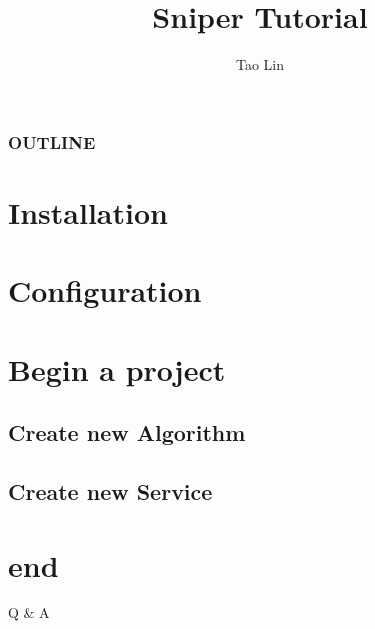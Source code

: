 \documentclass{beamer}
\begin{document}
\title{Sniper Tutorial}
\author{
    \texorpdfstring{Tao Lin}
                    {Lin Tao}
}


\maketitle

\begin{frame}
    \frametitle{OUTLINE}
    \tableofcontents
\end{frame}

\section{Installation}
    
\section{Configuration}
    
\section{Begin a project}
    
\subsection{Create new Algorithm}
    
\subsection{Create new Service}
    

\section*{end}
\begin{frame}
    \begin{center}
        \LARGE Q \& A
    \end{center}
\end{frame}
\end{document}
